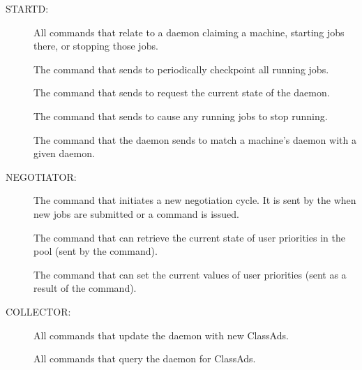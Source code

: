 STARTD:

\begin{description}
\item[] 

All commands that relate to a  daemon claiming
  a machine, starting jobs there, or stopping those jobs.

The command that  sends to periodically checkpoint
  all running jobs.

\item[]

The command that  sends to request the
  current state of the  daemon.

\item[]
The command that  sends to cause
  any running jobs to stop running.

\item[]
The command that the  daemon sends to
  match a machine's  daemon with a given 
  daemon.
\end{description}

NEGOTIATOR:

\begin{description}
\item[]
The command that initiates a new negotiation
  cycle. It is sent by the  when new jobs are submitted
  or a  command is issued.

\item[]
The command that can retrieve the current state
  of user priorities in the pool (sent by the  command).

\item[]
The command that can set the current
  values of user priorities (sent as a result of the 
  command).
\end{description}

COLLECTOR:

\begin{description}
\item[]
All commands that update the  daemon with new ClassAds.

\item[]
All commands that query the  daemon for ClassAds.
\end{description}

